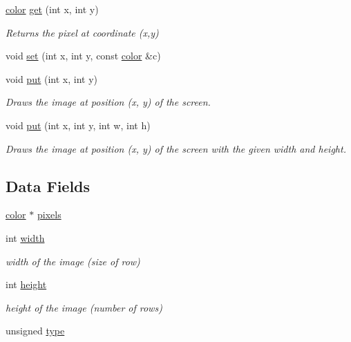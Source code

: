 \begin{DoxyCompactItemize}
\item 
\hyperlink{classcprocessing_1_1color}{color} \hyperlink{classcprocessing_1_1PImage_ab961583f0c5c97e747a14e85900548de}{get} (int x, int y)
\begin{DoxyCompactList}\small\item\em \-Returns the pixel at coordinate (x,y) \end{DoxyCompactList}\item 
void \hyperlink{classcprocessing_1_1PImage_ab624a6c5478a9f4ba17ec985333c6a3f}{set} (int x, int y, const \hyperlink{classcprocessing_1_1color}{color} \&c)
\item 
void \hyperlink{classcprocessing_1_1PImage_a2b3e8502a8d0dc519d867e8eed5d9c3e}{put} (int x, int y)
\begin{DoxyCompactList}\small\item\em \-Draws the image at position (x, y) of the screen. \end{DoxyCompactList}\item 
void \hyperlink{classcprocessing_1_1PImage_a5270bb1a528eeeaf8fabccf9243c3feb}{put} (int x, int y, int w, int h)
\begin{DoxyCompactList}\small\item\em \-Draws the image at position (x, y) of the screen with the given width and height. \end{DoxyCompactList}\end{DoxyCompactItemize}
\subsection*{\-Data \-Fields}
\begin{DoxyCompactItemize}
\item 
\hyperlink{classcprocessing_1_1color}{color} $\ast$ \hyperlink{classcprocessing_1_1PImage_a6c411ebe0b1bb92e0e17a3e5ffaf7bf0}{pixels}
\item 
int \hyperlink{classcprocessing_1_1PImage_a784b1e16d4ccfa218e8cf430ea6ca5ea}{width}
\begin{DoxyCompactList}\small\item\em width of the image (size of row) \end{DoxyCompactList}\item 
int \hyperlink{classcprocessing_1_1PImage_ac39c77f516dbbe493317455f8b095603}{height}
\begin{DoxyCompactList}\small\item\em height of the image (number of rows) \end{DoxyCompactList}\item 
unsigned \hyperlink{classcprocessing_1_1PImage_a465d1a7c776bc7735cc5bdb4dca20586}{type}
\end{DoxyCompactItemize}



